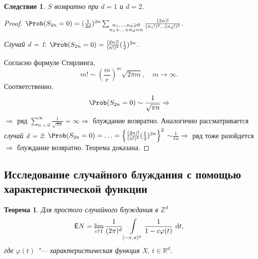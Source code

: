 \documentclass[a4paper]{article}
\newcommand{\Expect}{\mathsf{E}}
\theoremstyle{plain}
\newtheorem{thm}{Теорема}[section]
\newtheorem*{cor}{Следствие}
\theoremstyle{definition}
\theoremstyle{remark}
\theoremstyle{nonumberplain}
\newtheorem{proof}{Доказательство}
\theoremstyle{nonumberplain}
\begin{document}
\begin{cor}
  $S$ возвратно при $d = 1$ и $d = 2$.
\end{cor}

\begin{proof}
  $\Prob(S_{2n} = 0) = (\frac{1}{2d})^{2n} \sum_{\substack{n_{1}, \ldots, n_{d} \geqslant 0 \\ n_{1} + \ldots + n_{d} = n}} \frac{(2n)!}{(n_{1}!)^{2} \ldots (n_{d}!)^{2}}$.
  \begin{flushleft}
    \emph{Случай d = 1}: $\Prob(S_{2n} = 0) = \frac{(2n)!}{(n!)^{2}}(\frac{1}{2})^{2n}$.
  \end{flushleft}Согласно формуле Стирлинга,
  \begin{equation*}
    m! \sim \left(\frac{m}{e}\right)^{m} \sqrt{2 \pi m}, \quad m \rightarrow \infty.
  \end{equation*}
  Соответственно,
  \begin{equation*}
    \Prob(S_{2n} = 0) \sim \frac{1}{\sqrt{\pi n}} \Rightarrow
  \end{equation*}
  $\Rightarrow$ ряд $\sum\limits_{n=0}^{\infty} \frac{1}{\sqrt{\pi n}} = \infty \Rightarrow$ блуждание возвратно.
  Аналогично рассматривается \emph{случай d = 2}: $\Prob(S_{2n} = 0) = \ldots = \left\lbrace \frac{(2n)!}{(n!)^{2}}(\frac{1}{2})^{2n} \right\rbrace ^{2}$ $\sim \frac{1}{\pi n} \Rightarrow$ ряд тоже разойдется $\Rightarrow$ блуждание возвратно. Теорема доказана.
\end{proof}

\subsection{Исследование случайного блуждания с помощью характеристической функции}

\begin{thm}
  Для простого случайного блуждания в $\mathbb{Z}^{d}$
  \begin{equation*}
    \Expect N = \lim\limits_{c \uparrow 1} \frac{1}{(2 \pi)^{d}} \int\limits_{[-\pi, \pi]^{d}} \frac{1}{1 - c \varphi (t)}\,\dif t,
  \end{equation*}
  где $\varphi (t)$ "--- характеристическая функция X, $t \in \mathbb{R}^{d}$.
\end{thm}
\end{document}
